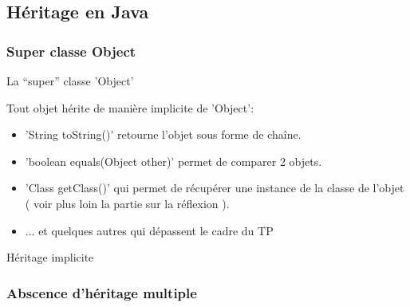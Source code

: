 \documentclass[handout]{beamer}
\begin{document}
\subsection{Héritage en Java}
\subsubsection{Super classe Object}
\begin{frame}
	\begin{block}{La ``super'' classe 'Object'}
	\end{block}
	Tout objet hérite de manière implicite de 'Object':
		\begin{itemize}
			\item 'String toString()' retourne l'objet sous forme de chaîne.
			\item 'boolean equals(Object other)' permet de comparer 2 objets.
			\item 'Class getClass()' qui permet de récupérer une instance de la classe de l'objet ( voir plus loin la partie sur la réflexion ).
			\item ... et quelques autres qui dépassent le cadre du TP
		\end{itemize}

	\begin{block}{Héritage implicite}
	\end{block}
	
\end{frame}

\subsubsection{Abscence d'héritage multiple}
\end{document}
